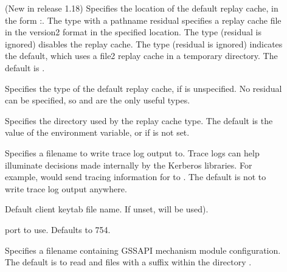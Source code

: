 \documentclass[letterpaper,10pt,english]{sphinxmanual}
\begin{document}
\begin{description}
\item[{}] \leavevmode
\sphinxAtStartPar
(New in release 1.18) Specifies the location of the default replay
cache, in the form :.  The  type with a
pathname residual specifies a replay cache file in the version\sphinxhyphen{}2
format in the specified location.  The  type (residual is
ignored) disables the replay cache.  The  type (residual is
ignored) indicates the default, which uses a file2 replay cache in
a temporary directory.  The default is .

\item[{}] \leavevmode
\sphinxAtStartPar
Specifies the type of the default replay cache, if
 is unspecified.  No residual can be specified,
so  and  are the only useful types.

\item[{}] \leavevmode
\sphinxAtStartPar
Specifies the directory used by the  replay cache type.
The default is the value of the  environment variable,
or  if  is not set.

\item[{}] \leavevmode
\sphinxAtStartPar
Specifies a filename to write trace log output to.  Trace logs can
help illuminate decisions made internally by the Kerberos
libraries.  For example, 
would send tracing information for {\hyperref[\detokenize{user/user_commands/kinit:kinit-1}]{}} to
.  The default is not to write trace log output
anywhere.

\item[{}] \leavevmode
\sphinxAtStartPar
Default client keytab file name.  If unset,  will be
used).

\item[{}] \leavevmode
\sphinxAtStartPar
{} port to use.  Defaults to 754.

\item[{}] \leavevmode
\sphinxAtStartPar
Specifies a filename containing GSSAPI mechanism module
configuration.  The default is to read 
and files with a  suffix within the directory
.

\end{description}
\end{document}
